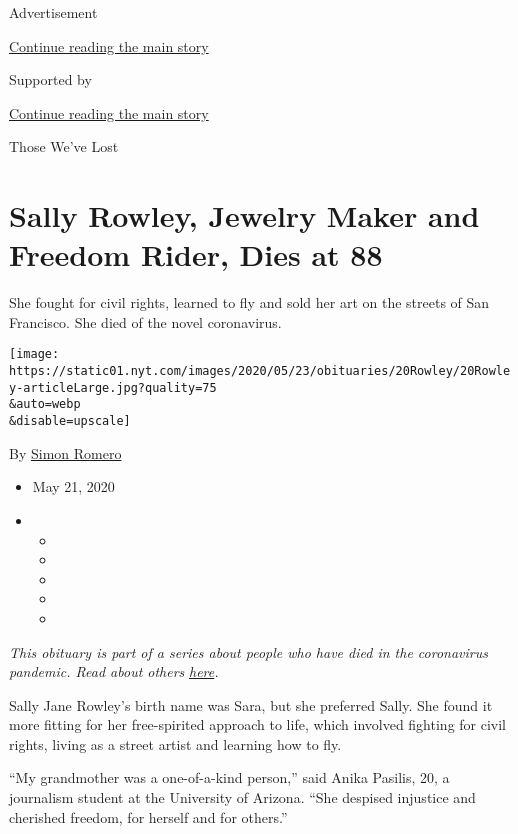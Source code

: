 Advertisement

\protect\hyperlink{after-top}{Continue reading the main story}

Supported by

\protect\hyperlink{after-sponsor}{Continue reading the main story}

Those We've Lost

\hypertarget{sally-rowley-jewelry-maker-and-freedom-rider-dies-at-88}{%
\section{Sally Rowley, Jewelry Maker and Freedom Rider, Dies at
88}\label{sally-rowley-jewelry-maker-and-freedom-rider-dies-at-88}}

She fought for civil rights, learned to fly and sold her art on the
streets of San Francisco. She died of the novel coronavirus.

\texttt{[image: https://static01.nyt.com/images/2020/05/23/obituaries/20Rowley/20Rowley-articleLarge.jpg?quality=75\\\&auto=webp\\\&disable=upscale]}

By \href{https://www.nytimes.com/by/simon-romero}{Simon Romero}

\begin{itemize}
\item
  May 21, 2020
\item
  \begin{itemize}
  \item
  \item
  \item
  \item
  \item
  \end{itemize}
\end{itemize}

\emph{This obituary is part of a series about people who have died in
the coronavirus pandemic. Read about others}
\href{https://www.nytimes.com/series/people-who-have-died-of-the-coronavirus}{\emph{here}}\emph{.}

Sally Jane Rowley's birth name was Sara, but she preferred Sally. She
found it more fitting for her free-spirited approach to life, which
involved fighting for civil rights, living as a street artist and
learning how to fly.

``My grandmother was a one-of-a-kind person,'' said Anika Pasilis, 20, a
journalism student at the University of Arizona. ``She despised
injustice and cherished freedom, for herself and for others.''

